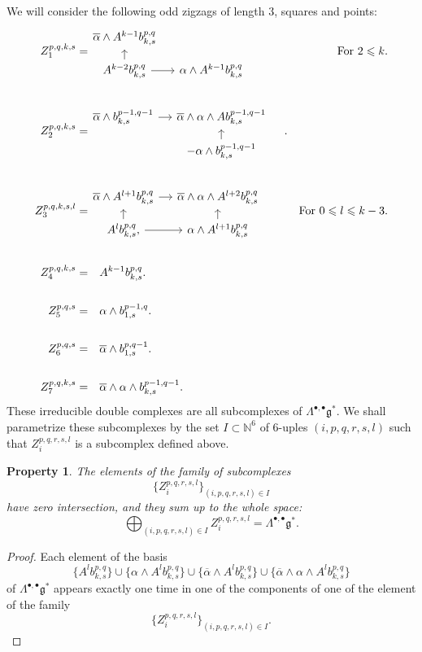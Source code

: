 \documentclass[leqno]{article}
\newtheorem{Property}[equation]{Property}
\theoremstyle{definition}
\numberwithin{equation}{section}
\begin{document}
We will consider the following odd zigzags of length $3$, squares and points:
\[
\aligned
Z_1^{p, q, k, s} = &\begin{tikzcd}[row sep=small, column sep = small]
\overline{\alpha} \wedge A^{k-1}b_{k, s}^{p, q}&  \\
A^{k-2}b_{k, s}^{p, q} \arrow[u] \arrow[r]& \alpha \wedge A^{k-1}b_{k, s}^{p, q}
\end{tikzcd}
&\text{For } 2 \leqslant k.
\\
\\
Z_2^{p, q, k, s} = &\begin{tikzcd}[row sep=small, column sep = small]
\overline{\alpha} \wedge b_{k, s}^{p-1, q-1} \arrow[r] & \overline{\alpha} \wedge \alpha \wedge Ab_{k, s}^{p-1, q-1}&  \\
& -\alpha \wedge b_{k, s}^{p-1, q-1} \arrow[u]
\end{tikzcd}.
\\
\\
Z_3^{p, q, k, s, l} = &\begin{tikzcd}[row sep=small, column sep = small]
\overline{\alpha} \wedge A^{l+1}b_{k, s}^{p, q} \arrow[r] & \overline{\alpha} \wedge \alpha \wedge A^{l+2}b_{k, s}^{p, q}&  \\
A^lb_{k, s}^{p, q} \arrow[r], \arrow[u] & \alpha \wedge A^{l+1}b_{k, s}^{p, q} \arrow[u]
\end{tikzcd}
&\text{For } 0 \leqslant l \leqslant k-3.
\\
\\
Z_4^{p, q, k, s} = &\quad A^{k-1}b_{k, s}^{p, q}.
\\
\\
Z_5^{p, q, s} = &\quad \alpha \wedge b_{1, s}^{p-1, q}.
\\
\\
Z_6^{p, q, s} = &\quad \overline{\alpha} \wedge b_{1, s}^{p, q-1}.
\\
\\
Z_7^{p, q, k, s} = &\quad \overline{\alpha} \wedge \alpha \wedge b_{k, s}^{p-1, q-1}.
\endaligned
\]
These irreducible double complexes are all subcomplexes of $\Lambda^{\bullet, \bullet}\mathfrak{g}^*$. We shall parametrize these subcomplexes by the set $I \subset \mathbb{N}^6$ of $6$-uples $(i, p, q, r, s, l)$ such that $Z_i^{p, q, r, s, l}$ is a subcomplex defined above. 
\begin{Property}
The elements of the family of subcomplexes
\[
\{
Z_i^{p, q, r, s, l}
\}_{(i, p, q, r, s, l) \in I}
\]
have zero intersection, and they sum up to the whole space:
\[
\bigoplus_{(i, p, q, r, s, l) \in I}
Z_i^{p, q, r, s, l}
=
\Lambda^{\bullet, \bullet}\mathfrak{g}^*.
\]
\end{Property}
\begin{proof}
Each element of the basis
\[
\{
A^lb_{k, s}^{p, q}
\}
\cup
\{
\alpha \wedge A^lb_{k, s}^{p, q}
\}
\cup
\{
\overline{\alpha} \wedge A^lb_{k, s}^{p, q}
\}
\cup
\{
\overline{\alpha} \wedge \alpha \wedge A^lb_{k, s}^{p, q}
\}
\]
of $\Lambda^{\bullet, \bullet}\mathfrak{g}^*$ appears exactly one time in one of the components of one of the element of the family
\[
\{
Z_i^{p, q, r, s, l}
\}_{(i, p, q, r, s, l) \in I}.
\]
\end{proof}
\end{document}
